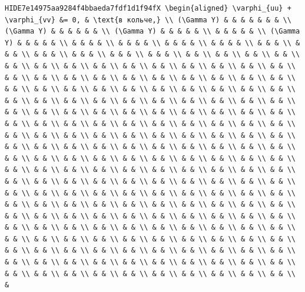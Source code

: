 \documentclass[
  ukrainian,
]{article}
\begin{document}
\begin{verbatim}
HIDE7e14975aa9284f4bbaeda7fdf1d1f94fX \begin{aligned} \varphi_{uu} + \varphi_{vv} &= 0, & \text{в кольче,} \\ (\Gamma Y) & & & & & & & \\ (\Gamma Y) & & & & & & \\ (\Gamma Y) & & & & & \\ & & & & & \\ (\Gamma Y) & & & & & \\ & & & & \\ & & & & \\ & & & & \\ & & & & \\ & & & \\ & & & \\ & & & \\ & & & \\ & & & \\ & & & \\ & & \\ & & \\ & & \\ & & \\ & & \\ & & \\ & & \\ & & \\ & & \\ & & \\ & & \\ & & \\ & & \\ & & \\ & & \\ & & \\ & & \\ & & \\ & & \\ & & \\ & & \\ & & \\ & & \\ & & \\ & & \\ & & \\ & & \\ & & \\ & & \\ & & \\ & & \\ & & \\ & & \\ & & \\ & & \\ & & \\ & & \\ & & \\ & & \\ & & \\ & & \\ & & \\ & & \\ & & \\ & & \\ & & \\ & & \\ & & \\ & & \\ & & \\ & & \\ & & \\ & & \\ & & \\ & & \\ & & \\ & & \\ & & \\ & & \\ & & \\ & & \\ & & \\ & & \\ & & \\ & & \\ & & \\ & & \\ & & \\ & & \\ & & \\ & & \\ & & \\ & & \\ & & \\ & & \\ & & \\ & & \\ & & \\ & & \\ & & \\ & & \\ & & \\ & & \\ & & \\ & & \\ & & \\ & & \\ & & \\ & & \\ & & \\ & & \\ & & \\ & & \\ & & \\ & & \\ & & \\ & & \\ & & \\ & & \\ & & \\ & & \\ & & \\ & & \\ & & \\ & & \\ & & \\ & & \\ & & \\ & & \\ & & \\ & & \\ & & \\ & & \\ & & \\ & & \\ & & \\ & & \\ & & \\ & & \\ & & \\ & & \\ & & \\ & & \\ & & \\ & & \\ & & \\ & & \\ & & \\ & & \\ & & \\ & & \\ & & \\ & & \\ & & \\ & & \\ & & \\ & & \\ & & \\ & & \\ & & \\ & & \\ & & \\ & & \\ & & \\ & & \\ & & \\ & & \\ & & \\ & & \\ & & \\ & & \\ & & \\ & & \\ & & \\ & & \\ & & \\ & & \\ & & \\ & & \\ & & \\ & & \\ & & \\ & & \\ & & \\ & & \\ & & \\ & & \\ & & \\ & & \\ & & \\ & & \\ & & \\ & & \\ & & \\ & & \\ & & \\ & & \\ & & \\ & & \\ & & \\ & & \\ & & \\ & & \\ & & \\ & & \\ & & \\ & & \\ & & \\ & & \\ & & \\ & & \\ & & \\ & & \\ & & \\ & 
\end{verbatim}
\end{document}
